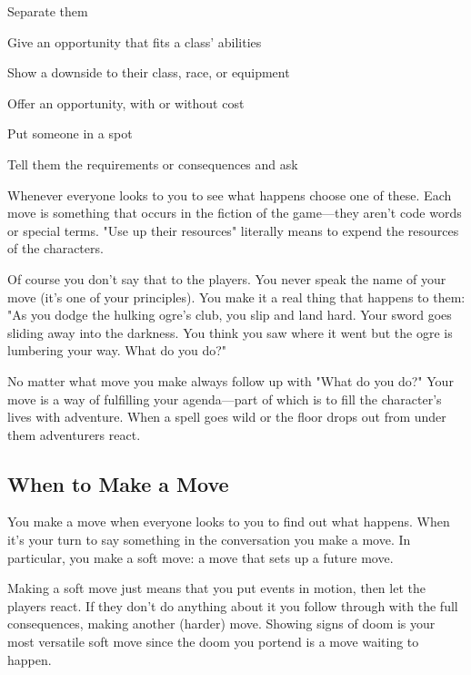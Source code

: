          
\item Separate them

         
\item Give an opportunity that fits a class' abilities

         
\item Show a downside to their class, race, or equipment

         
\item Offer an opportunity, with or without cost

         
\item Put someone in a spot

         
\item Tell them the requirements or consequences and ask

       
\stopitemize
       

Whenever everyone looks to you to see what happens choose one of these. Each move is something that occurs in the fiction of the game—they aren't code words or special terms. "Use up their resources" literally means to expend the resources of the characters.

       

Of course you don't say that to the players. You never speak the name of your move (it's one of your principles). You make it a real thing that happens to them: "As you dodge the hulking ogre's club, you slip and land hard. Your sword goes sliding away into the darkness. You think you saw where it went but the ogre is lumbering your way. What do you do?"

       

No matter what move you make always follow up with "What do you do?" Your move is a way of fulfilling your agenda—part of which is to fill the character's lives with adventure. When a spell goes wild or the floor drops out from under them adventurers react.

       
\subsection{When to Make a Move}   
       

You make a move when everyone looks to you to find out what happens. When it's your turn to say something in the conversation you make a move. In particular, you make a soft move: a move that sets up a future move.

       

Making a soft move just means that you put events in motion, then let the players react. If they don't do anything about it you follow through with the full consequences, making another (harder) move. Showing signs of doom is your most versatile soft move since the doom you portend is a move waiting to happen.

